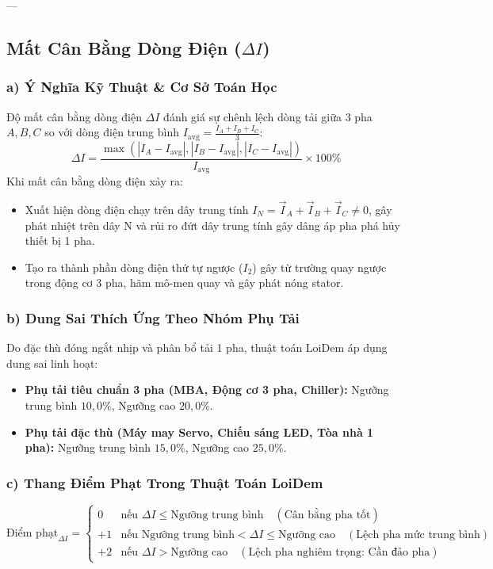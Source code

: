 \documentclass[12pt,a4paper]{article}
\begin{document}
---

\subsection{\texorpdfstring{Mất Cân Bằng Dòng Điện ($\Delta I$)}{Mất Cân Bằng Dòng Điện (Delta I)}}

\subsubsection{a) Ý Nghĩa Kỹ Thuật \& Cơ Sở Toán Học}
Độ mất cân bằng dòng điện $\Delta I$ đánh giá sự chênh lệch dòng tải giữa 3 pha $A, B, C$ so với dòng điện trung bình $I_{\mathrm{avg}} = \frac{I_A + I_B + I_C}{3}$:
\begin{equation}
  \Delta I = \frac{\max\left(|I_A - I_{\mathrm{avg}}|, |I_B - I_{\mathrm{avg}}|, |I_C - I_{\mathrm{avg}}|\right)}{I_{\mathrm{avg}}} \times 100\%
\end{equation}
Khi mất cân bằng dòng điện xảy ra:
\begin{itemize}
  \item Xuất hiện dòng điện chạy trên dây trung tính $I_N = \vec{I}_A + \vec{I}_B + \vec{I}_C \neq 0$, gây phát nhiệt trên dây N và rủi ro đứt dây trung tính gây dâng áp pha phá hủy thiết bị 1 pha.
  \item Tạo ra thành phần dòng điện thứ tự ngược ($I_2$) gây từ trường quay ngược trong động cơ 3 pha, hãm mô-men quay và gây phát nóng stator.
\end{itemize}

\subsubsection{b) Dung Sai Thích Ứng Theo Nhóm Phụ Tải}
Do đặc thù đóng ngắt nhịp và phân bổ tải 1 pha, thuật toán LoiDem áp dụng dung sai linh hoạt:
\begin{itemize}
  \item \textbf{Phụ tải tiêu chuẩn 3 pha (MBA, Động cơ 3 pha, Chiller):} Ngưỡng trung bình $10{,}0\%$, Ngưỡng cao $20{,}0\%$.
  \item \textbf{Phụ tải đặc thù (Máy may Servo, Chiếu sáng LED, Tòa nhà 1 pha):} Ngưỡng trung bình $15{,}0\%$, Ngưỡng cao $25{,}0\%$.
\end{itemize}

\subsubsection{c) Thang Điểm Phạt Trong Thuật Toán LoiDem}
\begin{equation}
  \text{Điểm phạt}_{\Delta I} = 
  \begin{cases} 
    0 & \text{nếu } \Delta I \le \text{Ngưỡng trung bình} \quad (\text{Cân bằng pha tốt}) \\
    +1 & \text{nếu } \text{Ngưỡng trung bình} < \Delta I \le \text{Ngưỡng cao} \quad (\text{Lệch pha mức trung bình}) \\
    +2 & \text{nếu } \Delta I > \text{Ngưỡng cao} \quad (\text{Lệch pha nghiêm trọng: Cần đảo pha})
  \end{cases}
\end{equation}
\end{document}
